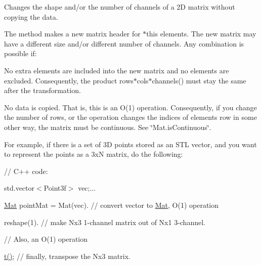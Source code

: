 Changes the shape and/or the number of channels of a 2D matrix without copying the data.

The method makes a new matrix header for {\ttfamily $\ast$this} elements. The new matrix may have a different size and/or different number of channels. Any combination is possible if\+:


\begin{DoxyItemize}
\item No extra elements are included into the new matrix and no elements are excluded. Consequently, the product {\ttfamily rows$\ast$cols$\ast$channels()} must stay the same after the transformation. 
\item No data is copied. That is, this is an O(1) operation. Consequently, if you change the number of rows, or the operation changes the indices of elements row in some other way, the matrix must be continuous. See \char`\"{}\+Mat.\+is\+Continuous\char`\"{}. 
\end{DoxyItemize}

For example, if there is a set of 3D points stored as an S\+TL vector, and you want to represent the points as a {\ttfamily 3xN} matrix, do the following\+: {\ttfamily }

{\ttfamily }

{\ttfamily }

{\ttfamily // C++ code\+:}

{\ttfamily }

{\ttfamily }

{\ttfamily std.\+vector$<$\+Point3f$>$ vec;...}

{\ttfamily }

{\ttfamily }

{\ttfamily \mbox{\hyperlink{classorg_1_1opencv_1_1core_1_1_mat}{Mat}} point\+Mat = Mat(vec). // convert vector to \mbox{\hyperlink{classorg_1_1opencv_1_1core_1_1_mat}{Mat}}, O(1) operation}

{\ttfamily }

{\ttfamily }

{\ttfamily reshape(1). // make Nx3 1-\/channel matrix out of Nx1 3-\/channel.}

{\ttfamily }

{\ttfamily }

{\ttfamily // Also, an O(1) operation}

{\ttfamily }

{\ttfamily }

{\ttfamily \mbox{\hyperlink{classorg_1_1opencv_1_1core_1_1_mat_a8df776cc748a0006e8837fcb7a1772f0}{t()}}; // finally, transpose the Nx3 matrix.}

